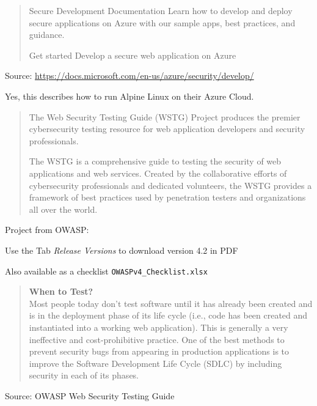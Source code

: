 \documentclass[Screen16to9,17pt]{foils}
\begin{document}
\begin{quote}
Secure Development Documentation
Learn how to develop and deploy secure applications on Azure with our sample apps, best practices, and guidance.

Get started
Develop a secure web application on Azure
\end{quote}

Source:
\url{https://docs.microsoft.com/en-us/azure/security/develop/}

Yes, this describes how to run Alpine Linux on their Azure Cloud.




\begin{quote}
The Web Security Testing Guide (WSTG) Project produces the premier cybersecurity
testing resource for web application developers and security professionals.

The WSTG is a comprehensive guide to testing the security of web applications and
web services. Created by the collaborative efforts of cybersecurity professionals
and dedicated volunteers, the WSTG provides a framework of best practices used by
penetration testers and organizations all over the world.
\end{quote}

\begin{list2}
\item Project from OWASP:\\
\item Use the Tab \emph{Release Versions} to download version 4.2 in PDF
\item Also available as a checklist \verb+OWASPv4_Checklist.xlsx+
\end{list2}




\begin{quote}\small{\bf
When to Test?}\\
Most people today don’t test software until it has already been created and is in the deployment phase of its life cycle (i.e., code has been created and instantiated into a working web application). This is generally a very ineffective and cost-prohibitive practice. One of the best methods to prevent security bugs from appearing in production applications is to improve the Software Development Life Cycle (SDLC) by including security in each of its phases.
\end{quote}
Source: OWASP Web Security Testing Guide
\end{document}
